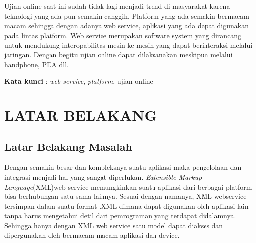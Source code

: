 \documentclass{jtetiproposalskripsi}
\begin{document}
\cover

\approvalpage


\begin{abstractind}
Ujian online saat ini sudah tidak lagi menjadi trend di masyarakat karena teknologi yang ada pun semakin canggih. Platform yang ada semakin bermacam-macam sehingga  dengan adanya web service, aplikasi yang ada dapat digunakan pada lintas platform.  Web service merupakan software system yang dirancang untuk mendukung interopabilitas mesin ke mesin yang dapat berinteraksi melalui jaringan. Dengan begitu ujian online dapat dilaksanakan meskipun melalui handphone, PDA dll.


\bigskip
\textbf{Kata kunci} : \emph{web service}, \emph{platform}, ujian online.
\end{abstractind}

\tableofcontents
{}
\clearpage{}\setcounter{page}{1}

\chapter{LATAR BELAKANG}

\section{Latar Belakang Masalah}
Dengan semakin besar dan kompleksnya suatu aplikasi maka pengelolaan dan integrasi menjadi hal yang sangat diperlukan.  \emph{Extensible Markup Language}(XML)web service memungkinkan suatu aplikasi dari berbagai platform bisa berhubungan satu sama lainnya. Sesuai dengan namanya, XML webservice tersimpan dalam suatu format .XML dimana dapat digunakan oleh aplikasi lain tanpa harus mengetahui detil dari pemrograman yang terdapat didalamnya. Sehingga hanya dengan XML web service satu model dapat diakses dan dipergunakan oleh bermacam-macam aplikasi dan device.
\end{document}
